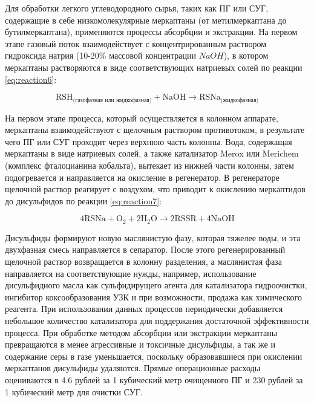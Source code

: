 Для обработки легкого углеводородного сырья, таких как ПГ или  СУГ, содержащие в себе низкомолекулярные меркаптаны (от метилмеркаптана до бутилмеркаптана), применяются процессы абсорбции и экстракции. На первом этапе газовый поток взаимодействует с концентрированным раствором гидроксида натрия (10-20\% массовой концентрации $NaOH$), в котором меркаптаны растворяются в виде соответствующих натриевых солей по реакции \cref{eq:reaction6}:

\begin{equation}
	\label{eq:reaction6}
	\mathrm{RSH_\text{(газофазная или жидкофазная)} + NaOH \rightarrow RSNa_\text{(жидкофазная)}} 
\end{equation}

На первом этапе процесса, который осуществляется в колонном аппарате, меркаптаны взаимодействуют с щелочным раствором противотоком, в результате чего ПГ или СУГ проходит через верхнюю часть колонны. Вода, содержащая меркаптаны в виде натриевых солей, а также катализатор Merox или Merichem (комплекс фталоцианина кобальта), вытекает из нижней части колонны, затем подогревается и направляется на окисление в регенератор. В регенераторе щелочной раствор реагирует с воздухом, что приводит к окислению меркаптидов до дисульфидов по реакции \cref{eq:reaction7}:

\begin{equation}	
	\mathrm{4RSNa + O_2 + 2H_2O \rightarrow 2RSSR + 4NaOH} \label{eq:reaction7}
\end{equation}

Дисульфиды формируют новую маслянистую фазу, которая тяжелее воды, и эта двухфазная смесь направляется в сепаратор. После этого регенерированный щелочной раствор возвращается в колонну разделения, а маслянистая фаза направляется на соответствующие нужды, например, использование дисульфидного масла как сульфидирущего агента для катализатора гидроочистки, ингибитор коксообразования УЗК и при возможности, продажа как химического реагента. При использовании данных процессов периодически добавляется небольшое количество катализатора для поддержания достаточной эффективности процесса. При обработке методом абсорбции или экстракции меркаптаны превращаются в менее агрессивные и токсичные дисульфиды, а так же и содержание серы в газе уменьшается, поскольку образовавшиеся при окислении меркаптанов дисульфиды удаляются. Прямые операционные расходы оцениваются в \num{4,6} рублей за \num{1} кубический метр очищенного ПГ и \num{230} рублей за \num{1} кубический метр для очистки СУГ.

